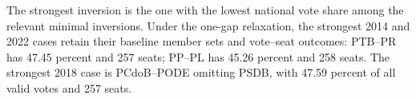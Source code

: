 \documentclass[11pt]{article}
\begin{document}



The strongest inversion is the one with the lowest national vote share among
the relevant minimal inversions. Under the  one-gap relaxation, the
strongest 2014 and 2022 cases retain their baseline member sets and vote--seat
outcomes: PTB--PR has 47.45 percent and 257 seats; PP--PL has 45.26 percent and
258 seats. The strongest 2018 case is PCdoB--PODE omitting PSDB, with
47.59 percent of all valid votes and 257 seats.

\end{document}
